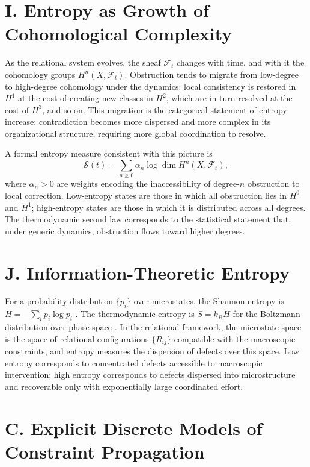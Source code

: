 \documentclass[12pt,a4paper,openany]{book}
\theoremstyle{plain}
\theoremstyle{definition}
\theoremstyle{remark}
\begin{document}
\section*{I. Entropy as Growth of Cohomological Complexity}

As the relational system evolves, the sheaf $\mathcal{F}_t$ changes with time, and with it the cohomology groups $H^n(X, \mathcal{F}_t)$. Obstruction tends to migrate from low-degree to high-degree cohomology under the dynamics: local consistency is restored in $H^1$ at the cost of creating new classes in $H^2$, which are in turn resolved at the cost of $H^3$, and so on. This migration is the categorical statement of entropy increase: contradiction becomes more dispersed and more complex in its organizational structure, requiring more global coordination to resolve.

A formal entropy measure consistent with this picture is
\[
\mathcal{S}(t) = \sum_{n \geq 0} \alpha_n \log \dim H^n(X, \mathcal{F}_t),
\]
where $\alpha_n > 0$ are weights encoding the inaccessibility of degree-$n$ obstruction to local correction. Low-entropy states are those in which all obstruction lies in $H^0$ and $H^1$; high-entropy states are those in which it is distributed across all degrees. The thermodynamic second law corresponds to the statistical statement that, under generic dynamics, obstruction flows toward higher degrees.

\section*{J. Information-Theoretic Entropy}

For a probability distribution $\{p_i\}$ over microstates, the Shannon entropy is $H = -\sum_i p_i \log p_i$ \cite{Shannon1948}. The thermodynamic entropy is $S = k_B H$ for the Boltzmann distribution over phase space \cite{Jaynes1957}. In the relational framework, the microstate space is the space of relational configurations $\{R_{ij}\}$ compatible with the macroscopic constraints, and entropy measures the dispersion of defects over this space. Low entropy corresponds to concentrated defects accessible to macroscopic intervention; high entropy corresponds to defects dispersed into microstructure and recoverable only with exponentially large coordinated effort.


\section*{C. Explicit Discrete Models of Constraint Propagation}
\label{app:discrete_models}
\end{document}
